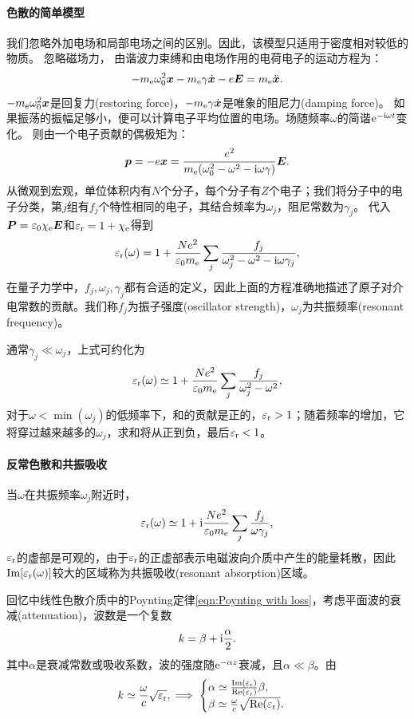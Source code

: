 \paragraph{色散的简单模型}
我们忽略外加电场和局部电场之间的区别。因此，该模型只适用于密度相对较低的物质。
忽略磁场力，
由谐波力束缚和由电场作用的电荷电子的运动方程为：
\[
    -m_\mathrm e\omega_0^2\bm x-m_\mathrm e\gamma\dot{\bm x}-e\bm E=m_\mathrm e\ddot{\bm x}.
\]
$-m_\mathrm e\omega_0^2\bm x$是回复力(restoring force)，$-m_\mathrm e\gamma\dot{\bm x}$是唯象的阻尼力(damping force)。
如果振荡的振幅足够小，便可以计算电子平均位置的电场。场随频率$\omega$的简谐$\mathop{}\!\mathrm{e}^{-\mathrm{i}\omega t}$变化。
则由一个电子贡献的偶极矩为：
\[
    \bm p=-e\bm x=\frac{e^2}{m_\mathrm e(\omega_0^2-\omega^2-\mathrm{i}\omega\gamma)}\bm E.
\]
从微观到宏观，单位体积内有$N$个分子，每个分子有$Z$个电子；我们将分子中的电子分类，第$j$组有$f_j$个特性相同的电子，其结合频率为$\omega_j$，阻尼常数为$\gamma_j$。
代入$\bm P=\varepsilon_0\chi_\mathrm e\bm E$和$\varepsilon_\text r=1+\chi_\mathrm e$得到
\begin{equation}
    \varepsilon_\text r(\omega)=1+\frac{Ne^2}{\varepsilon_0m_\mathrm e}\sum_j\frac{f_j}{\omega_j^2-\omega^2-\mathrm{i}\omega\gamma_j},
\end{equation}
在量子力学中，$f_j,\omega_j,\gamma_j$都有合适的定义，因此上面的方程准确地描述了原子对介电常数的贡献。我们称$f_j$为振子强度(oscillator strength)，$\omega_j$为共振频率(resonant frequency)。

通常$\gamma_j\ll\omega_j$，上式可约化为
\[
    \varepsilon_\text r(\omega)\simeq 1+\frac{Ne^2}{\varepsilon_0m_\mathrm e}\sum_j\frac{f_j}{\omega_j^2-\omega^2},
\]
对于$\omega<\min(\omega_j)$的低频率下，和的贡献是正的，$\varepsilon_\text r>1$；随着频率的增加，它将穿过越来越多的$\omega_j$，求和将从正到负，最后$\varepsilon_\text r<1$。

\paragraph{反常色散和共振吸收}

当$\omega$在共振频率$\omega_j$附近时，
\[
    \varepsilon_\text r(\omega)\simeq 1+\mathrm{i}\frac{Ne^2}{\varepsilon_0m_\mathrm e}\sum_j\frac{f_j}{\omega\gamma_j},
\]
$\varepsilon_\text r$的虚部是可观的，由于$\varepsilon_\text r$的正虚部表示电磁波向介质中产生的能量耗散，因此$\operatorname{Im}[\varepsilon_\text r(\omega)]$较大的区域称为共振吸收(resonant absorption)区域。

回忆中线性色散介质中的Poynting定律\eqref{eqn:Poynting with loss}，考虑平面波的衰减(attenuation)，波数是一个复数
\[
    k=\beta+\mathrm{i}\frac\alpha 2.
\]
其中$\alpha$是衰减常数或吸收系数，波的强度随$\mathop{}\!\mathrm{e}^{-\alpha z}$衰减，且$\alpha\ll\beta$。由
\[
    k\simeq\frac\omega c\sqrt{\varepsilon_\text r},\implies
    \begin{cases}
        \alpha\simeq\frac{\operatorname{Im}(\varepsilon_\text r)}{\operatorname{Re}(\varepsilon_\text r)}\beta,\\
        \beta\simeq\frac\omega c\sqrt{\operatorname{Re}(\varepsilon_\text r)}.
    \end{cases}
\]

